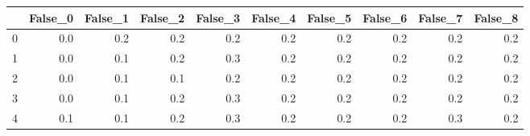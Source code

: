 \begin{tabular}{lrrrrrrrrr}
\toprule
{} &  False\_0 &  False\_1 &  False\_2 &  False\_3 &  False\_4 &  False\_5 &  False\_6 &  False\_7 &  False\_8 \\ \hline
\midrule
0 &      0.0 &      0.2 &      0.2 &      0.2 &      0.2 &      0.2 &      0.2 &      0.2 &      0.2 \\ \hline
1 &      0.0 &      0.1 &      0.2 &      0.3 &      0.2 &      0.2 &      0.2 &      0.2 &      0.2 \\ \hline
2 &      0.0 &      0.1 &      0.1 &      0.2 &      0.2 &      0.2 &      0.2 &      0.2 &      0.2 \\ \hline
3 &      0.0 &      0.1 &      0.2 &      0.3 &      0.2 &      0.2 &      0.2 &      0.2 &      0.2 \\ \hline
4 &      0.1 &      0.1 &      0.2 &      0.3 &      0.2 &      0.2 &      0.2 &      0.3 &      0.2 \\ \hline
\bottomrule
\end{tabular}

